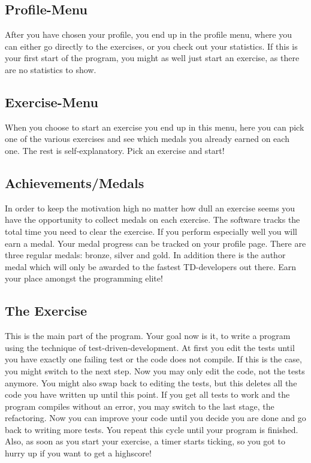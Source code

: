 \documentclass[10pt,a4paper]{article}
\begin{document}
\subsection{Profile-Menu}
After you have chosen your profile, you end up in the profile menu, where you can either go directly to the exercises, or you check out your statistics. If this is your first start of the program, you might as well just start an exercise, as there are no statistics to show.
\subsection{Exercise-Menu}
When you choose to start an exercise you end up in this menu, here you can pick one of the various exercises and see which medals you already earned on each one.
The rest is self-explanatory. Pick an exercise and start!
\subsection{Achievements/Medals}
In order to keep the motivation high no matter how dull an exercise seems you have the opportunity to collect medals on each exercise. The software tracks the total time you need to clear the exercise. If you perform especially well you will earn
a medal. Your medal progress can be tracked on your profile page.
There are three regular medals: bronze, silver and gold. In addition there is the author medal which will only be awarded to the fastest TD-developers out there.
Earn your place amongst the programming elite!
\subsection{The Exercise}
This is the main part of the program. Your goal now is it, to write a program using the technique of test-driven-development.
At first you edit the tests until you have exactly one failing test or the code does not compile. If this is the case, you might switch to the next step.
Now you may only edit the code, not the tests anymore. You might also swap back to editing the tests, but this deletes all the code you have written up until this point. If you get all tests to work and the program compiles without an error, you may switch to the last stage, the refactoring. Now you can improve your code until you decide you are done and go back to writing more tests. You repeat this cycle until your program is finished.
Also, as soon as you start your exercise, a timer starts ticking, so you got to hurry up if you want to get a highscore! 
\end{document}
